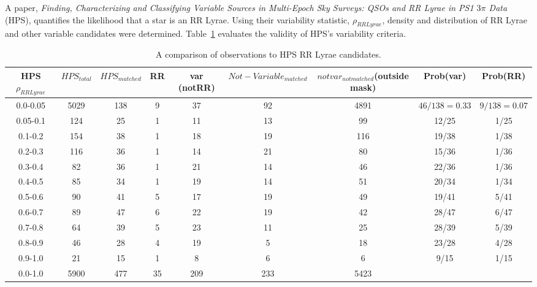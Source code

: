 \documentclass[aps,prb,twocolumn,superscriptaddress]{revtex4-1}
\begin{document}
A paper, \textit{Finding, Characterizing and Classifying Variable Sources in Multi-Epoch Sky Surveys: QSOs and RR Lyrae in PS1 $3\pi$ Data}~\cite{PSdata} (HPS), quantifies the likelihood that a star is an RR Lyrae.  Using their variability statistic, $\rho_{RRLyrae}$, density and distribution of RR Lyrae and other variable candidates were determined.  Table~\ref{tab:HPSlim15} evaluates the validity of HPS's variability criteria.
\iffalse
	\begin{table}
	\begin{center}
		\begin{tabular}{|c|c|c|c|c|c|c|c|c|}\hline
	HPS $\rho_{RRLyrae}$ & $HPS_{total}$ & $HPS_{matched}$ & RR & var (notRR) & $Not-Variable_{matched}$ &$notvar_{notmatched}$(outside mask)& Prob(var)&Prob(RR) \\ \hline
	0.0-0.05 & 5029 & 138 & 9 & 37 & 92 	& 4891 & $46/138=0.33$ & $9/138=0.07$	\\ \hline
	0.05-0.1 & 124 & 25 & 1 & 11 & 13 		& 99 & 12/25 & 1/25 \\ \hline
	0.1-0.2 & 154 & 38 & 1 & 18 & 19 		& 116 & 19/38 & 1/38 \\ \hline
	0.2-0.3 & 116 & 36 & 1 & 14 & 21 		& 80 & 15/36 & 1/36 \\ \hline
	0.3-0.4 & 82 & 36 & 1 & 21 & 14 		& 46 & 22/36 & 1/36	\\ \hline
	0.4-0.5 & 85 & 34 & 1 & 19 & 14 		& 51 & 20/34 & 1/34	\\ \hline
	0.5-0.6 & 90 & 41 & 5 & 17 & 19 		& 49 & 19/41 & 5/41	\\ \hline
	0.6-0.7 & 89 & 47 & 6 & 22 & 19 		& 42 & 28/47 & 6/47	\\ \hline
	0.7-0.8 & 64 & 39 & 5 & 23 & 11 		& 25 & 28/39 & 5/39	\\ \hline
	0.8-0.9 & 46 & 28 & 4 & 19 & 5 			& 18 & 23/28 & 4/28	\\ \hline
	0.9-1.0 & 21 & 15 & 1 & 8 & 6 			& 6 & 9/15 & 1/15	\\ \hline
	\hline
	0.0-1.0 & 5900 & 477 & 35 & 209 & 233 	& 5423 & & \\ \hline
		\end{tabular}
	\end{center}
	\caption{ \small{A comparison of observations to HPS RR Lyrae candidates. \label{tab:HPSlim15}}}
	\end{table}
\end{document}
